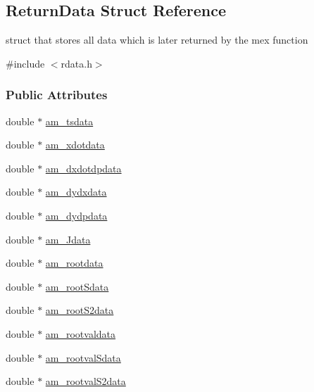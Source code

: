 \hypertarget{struct_return_data}{}\subsection{Return\+Data Struct Reference}
\label{struct_return_data}


struct that stores all data which is later returned by the mex function  




{\ttfamily \#include $<$rdata.\+h$>$}

\subsubsection*{Public Attributes}
\begin{DoxyCompactItemize}
\item 
double $\ast$ \hyperlink{struct_return_data_a577298549da7c9dbe3d93fbf3bc17866}{am\+\_\+tsdata}
\item 
double $\ast$ \hyperlink{struct_return_data_a3ea8fa08fcced0827c1df276b0d253c8}{am\+\_\+xdotdata}
\item 
double $\ast$ \hyperlink{struct_return_data_a494b13e9797d95d7fb3c89e09864aa4f}{am\+\_\+dxdotdpdata}
\item 
double $\ast$ \hyperlink{struct_return_data_a831cada35b4f407a2c8ad789dfc534e5}{am\+\_\+dydxdata}
\item 
double $\ast$ \hyperlink{struct_return_data_a57a7eb2085d8ed5bb6c62331a2aa3af5}{am\+\_\+dydpdata}
\item 
double $\ast$ \hyperlink{struct_return_data_a82d71415ca06c969ebd22a02e4789b1d}{am\+\_\+\+Jdata}
\item 
double $\ast$ \hyperlink{struct_return_data_af1a09a94b46b2a4e6b3e90d37a7fdbe3}{am\+\_\+rootdata}
\item 
double $\ast$ \hyperlink{struct_return_data_a98be71879a3ad48c62a203c0a03457f5}{am\+\_\+root\+Sdata}
\item 
double $\ast$ \hyperlink{struct_return_data_a4d7116a416a12564e8058589889357ba}{am\+\_\+root\+S2data}
\item 
double $\ast$ \hyperlink{struct_return_data_a4991fdb926d3db2f28c327165d0c11c4}{am\+\_\+rootvaldata}
\item 
double $\ast$ \hyperlink{struct_return_data_adc0a319cb427b2ad2fef3f2cbd69d765}{am\+\_\+rootval\+Sdata}
\item 
double $\ast$ \hyperlink{struct_return_data_a63a3d2f728c5789c4b93a84ecaf29cfa}{am\+\_\+rootval\+S2data}
\item 

\end{DoxyCompactItemize}
